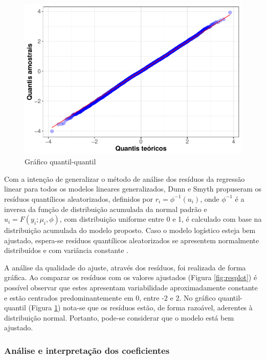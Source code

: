 \documentclass[twocolumn]{rbef}
\newcommand{\1}{\mathbbm{1}}
\begin{document}
\begin{figure}

{\centering \includegraphics[width=1\linewidth]{article_files/figure-latex/qqplot-1} 

}

\caption{Gráfico quantil-quantil}\label{fig:qqplot}
\end{figure}

Com a intenção de generalizar o método de análise dos resíduos da regressão linear para todos os modelos lineares generalizados, Dunn e Smyth \cite{Dunn1996} propuseram os resíduos quantílicos aleatorizados, definidos por \(r_i = \phi^{-1}(u_i)\), onde \(\phi^{-1}\) é a inversa da função de distribuição acumulada da normal padrão e \(u_i = F(y_i;\mu_i,\phi)\), com distribuição uniforme entre 0 e 1, é calculado com base na distribuição acumulada do modelo proposto. Caso o modelo logístico esteja bem ajustado, espera-se resíduos quantílicos aleatorizados se apresentem normalmente distribuídos e com variância constante \cite{Taconeli2015}.

A análise da qualidade do ajuste, através dos resíduos, foi realizada de forma gráfica. Ao comparar os resíduos com os valores ajustados (Figura \ref{fig:resplot}) é possível observar que estes apresentam variabilidade aproximadamente constante e estão centrados predominantemente em 0, entre -2 e 2. No gráfico quantil-quantil \cite{Wilk1968} (Figura \ref{fig:qqplot}) nota-se que os resíduos estão, de forma razoável, aderentes à distribuição normal. Portanto, pode-se considerar que o modelo está bem ajustado.

\hypertarget{anuxe1lise-e-interpretauxe7uxe3o-dos-coeficientes}{%
\subsubsection{Análise e interpretação dos coeficientes}\label{anuxe1lise-e-interpretauxe7uxe3o-dos-coeficientes}}
\end{document}
